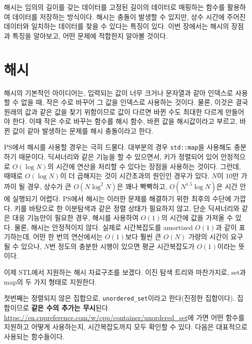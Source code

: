 해시는 임의의 길이를 갖는 데이터를 고정된 길이의 데이터로 매핑하는 함수를 활용하여 데이터를 저장하는 방식이다. 해시는 충돌이 발생할 수 있지만, 상수 시간에 주어진 데이터와 일치하는 데이터를 찾을 수 있다는 특징이 있다. 이번 장에서는 해시의 장점과 특징을 알아보고, 어떤 문제에 적합한지 알아볼 것이다.


\section{해시}
해시의 기본적인 아이디어는, 입력되는 값이 너무 크거나 문자열과 같아 인덱스로 사용할 수 없을 때, 작은 수로 바꾸어 그 값을 인덱스로 사용하는 것이다. 물론, 이것은 결국 원래의 값과 같은 값을 찾기 위함이므로 값이 다르면 바뀐 수도 최대한 다르게 만들어야 한다. 이때 작은 수로 바꾸는 함수를 해시 함수, 바뀐 값을 해시값이라고 부르고, 바뀐 값이 같아 발생하는 문제를 해시 충돌이라고 한다.

PS에서 해시를 사용할 경우는 극히 드물다. 대부분의 경우 \texttt{std::map}을 사용해도 충분하기 때문이다. 딕셔너리와 같은 기능을 할 수 있으면서, 키가 정렬되어 있어 안정적으로 $O(\log N)$의 시간에 연산을 처리할 수 있다는 장점을 사용하는 것이다. 그런데, 때때로 $O(\log N)$이 더 곱해지는 것이 시간초과의 원인인 경우가 있다. $N$이 10만 가까이 될 경우, 상수가 큰 $O(N \log^2 N)$은 꽤나 빡빡하고, $O(N^{1.5} \log N)$은 시간 안에 실행되기 어렵다. PS에서 해시는 이러한 문제를 해결하기 위한 최후의 수단에 가깝다. 키를 바탕으로 한 이분탐색과 같은 정렬 상태가 필요하지 않고, 단순 딕셔너리와 같은 대응 기능만이 필요한 경우, 해시를 사용하여 $O(1)$의 시간에 값을 가져올 수 있다. 물론, 해시는 안정적이지 않다. 실제로 시간복잡도를 amortized $O(1)$과 같이 표기하는데, 어떤 한 번의 연산에서는 $O(1)$보다 훨씬 큰 $O(N)$ 가량의 시간이 요구될 수 있으나, $N$번 정도의 충분한 시행이 있으면 평균 시간복잡도가 $O(1)$이라는 뜻이다.

이제 STL에서 지원하는 해시 자료구조를 보겠다. 이진 탐색 트리와 마찬가지로, set과 map의 두 가지 형태로 지원한다. 

첫번째는 정렬되지 않은 집합으로, \texttt{unordered\_set}이라고 한다(진정한 집합이다). 집합이므로 \textbf{같은 수의 추가는 무시}된다. \url{https://en.cppreference.com/w/cpp/container/unordered_set}에 가면 어떤 함수를 지원하고 어떻게 사용하는지, 시간복잡도까지 모두 확인할 수 있다. 다음은 대표적으로 사용되는 함수들이다.

